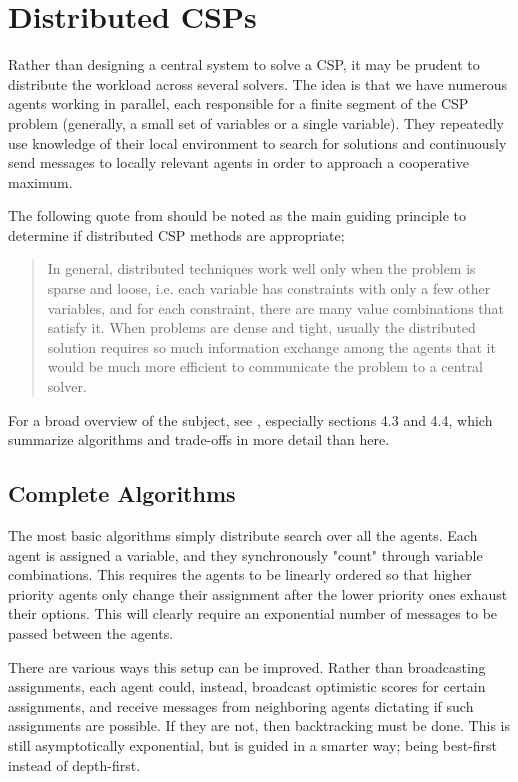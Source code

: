 \section{Distributed CSPs}\label{sec:distributed-csps}

Rather than designing a central system to solve a CSP, it may be prudent to distribute the workload across several solvers. The idea is that we have numerous agents working in parallel, each responsible for a finite segment of the CSP problem (generally, a small set of variables or a single variable). They repeatedly use knowledge of their local environment to search for solutions and continuously send messages to locally relevant agents in order to approach a cooperative maximum.

The following quote from \citep{rossi2006handbook} should be noted as the main guiding principle to determine if distributed CSP methods are appropriate;

\begin{quote}
    In general, distributed techniques work well only when the problem is sparse and loose, i.e. each variable has constraints with only a few other variables, and for each constraint, there are many value combinations that satisfy it. When problems are dense and tight, usually the distributed solution requires so much information exchange among the agents that it would be much more efficient to communicate the problem to a central solver.
\end{quote}

For a broad overview of the subject, see \citep{fioretto2018distributed}, especially sections 4.3 and 4.4, which summarize algorithms and trade-offs in more detail than here.

\subsection{Complete Algorithms}\label{sec:complete-algorithms}

The most basic algorithms simply distribute search over all the agents. Each agent is assigned a variable, and they synchronously "count" through variable combinations. This requires the agents to be linearly ordered so that higher priority agents only change their assignment after the lower priority ones exhaust their options. This will clearly require an exponential number of messages to be passed between the agents.

There are various ways this setup can be improved. Rather than broadcasting assignments, each agent could, instead, broadcast optimistic scores for certain assignments, and receive messages from neighboring agents dictating if such assignments are possible. If they are not, then backtracking must be done. This is still asymptotically exponential, but is guided in a smarter way; being best-first instead of depth-first.

